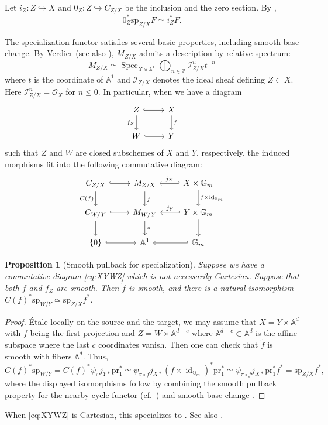 \documentclass[11pt]{amsart}
\numberwithin{equation}{section}
\newtheorem{proposition}[theorem]{Proposition}
\theoremstyle{definition}
\def\beq{\begin{equation}}
\def\eeq{\end{equation}}
\DeclareMathOperator{\Spec}{\mathrm{Spec}}
\def\sp{\mathrm{sp}}
\DeclareMathOperator{\id}{id}
\def\A{\mathbb{A}}
\def\Gm{\mathbb{G}_m}
\def\ZZ{\mathbb{Z}}
\def\pr{\mathrm{pr}}
\begin{document}
Let $i_Z:Z\hookrightarrow X$ and $0_Z:Z\hookrightarrow C_{Z/X}$ be
the inclusion and the zero section. By \cite[(SP5)]{verdier},
\beq\label{eq:sp.zero}
0_Z^*\sp_{Z/X}F\simeq i_Z^*F.
\eeq

The specialization functor satisfies several basic properties, including smooth base change.
By Verdier \cite{verdier-riemann-roch} (see also \cite[Chapter~5]{Fu98}), $M_{Z/X}$ admits a description by relative spectrum:
\[M_{Z/X}\simeq \Spec_{X\times \A^1} \bigoplus_{n\in \ZZ}\mathcal I_{Z/X}^nt^{-n}\]
where $t$ is the coordinate of $\A^1$ and $\mathcal I_{Z/X}$ denotes the ideal sheaf defining $Z\subset X$. Here $\mathcal I^n_{Z/X}=\mathcal O_X$ for $n\leq 0$. 
In particular, when we have a diagram %
\beq\label{eq:XYWZ}\begin{tikzcd}
		Z\arrow[r,hook]\arrow[d,"f_Z"']& X\arrow[d,"f"]\\ W\arrow[r,hook]& Y
	\end{tikzcd}\eeq
such that $Z$ and $W$ are closed subschemes of $X$ and $Y$,
respectively, the induced morphisms fit into the following commutative diagram:
\[\begin{tikzcd}
	C_{Z/X}\arrow[r,hook]\arrow[d,"C(f)"']&M_{Z/X}\arrow[d,"\tilde f"] &X\times \Gm \arrow[l,hook',"j_X"']\arrow[d,"f\times \id_{\Gm}"] \\ C_{W/Y}\arrow[r,hook]\arrow[d]&M_{W/Y}\arrow[d,"\pi"]& Y\times \Gm \arrow[l,hook',"j_Y"']\arrow[d]\\ \{0\}\arrow[r,hook] & \A^1& \Gm \arrow[l,hook']
\end{tikzcd}\]

\begin{proposition}[Smooth pullback for specialization]\label{prop:sp.smooth}
	Suppose we have a commutative diagram 
	\eqref{eq:XYWZ}
	which is not necessarily Cartesian. 
	Suppose that both $f$ and $f_Z$ are smooth. 
	Then $\tilde f$ is smooth, and 
	there is a natural isomorphism $C(f)^* \sp_{W/Y}\simeq\sp_{Z/X}f^*$.
\end{proposition}
\begin{proof}
	\'Etale locally on the source and the target, we may assume that $X= Y\times \A^d$ with $f$ being the first projection and $Z= W\times \A^{d-c}$ where $\A^{d-c}\subset \A^{d}$ is the affine subspace where the last $c$ coordinates vanish. Then one can check that $\tilde f$ is smooth with fibers $\A^d$. Thus,
	\[C(f)^*\sp_{W/Y}= C(f)^*\psi_\pi j_{Y*}\pr_1^*\simeq \psi_{\pi\circ \tilde f}j_{X*}(f\times \id_{\Gm})^*\pr_1^* \simeq \psi_{\pi\circ \tilde f}j_{X*}\pr_1^*f^*= \sp_{Z/X}f^*,\]
	where the displayed isomorphisms follow by combining the smooth pullback property for the nearby cycle functor (cf.~\cite[Lemma~4.1.7(2)]{Achar}) and smooth base change \cite[Theorem~2.2.2]{Achar}.
\end{proof}
When \eqref{eq:XYWZ} is Cartesian, this specializes to \cite[(SP3)]{verdier}. 
See also \cite[Proposition~4.2.5]{KS94}.
\end{document}
